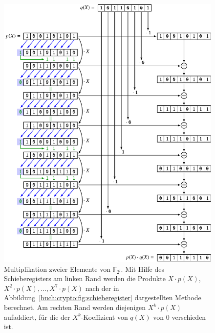 \begin{figure}
\centering
\includegraphics[width=\textwidth]{chapters/90-crypto/images/multiplikation.pdf}
\caption{Multiplikation zweier Elemente von $\mathbb{F}_{2^l}$.
Mit Hilfe des Schieberegisters am linken Rand werden die Produkte 
$X\cdot p(X)$, $X^2\cdot p(X),\dots,X^7\cdot p(X)$ nach der in
Abbildung~\ref{buch:crypto:fig:schieberegister} dargestellten
Methode berechnet.
Am rechten Rand werden diejenigen $X^k\cdot p(X)$ aufaddiert,
für die der $X^k$-Koeffizient von $q(X)$ von $0$ verschieden ist.
\label{buch:crypto:fig:multiplikation}}
\end{figure}



